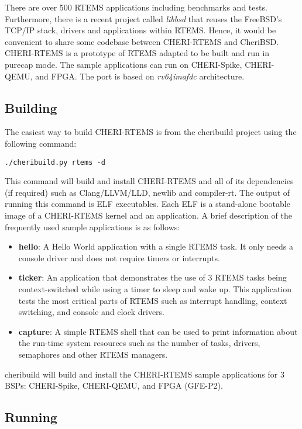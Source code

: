 \documentclass[12pt,twoside,openright,a4paper]{article}
\begin{document}
There are over 500 RTEMS applications including benchmarks and tests.
Furthermore, there is a recent project called \textit{libbsd} that reuses
the FreeBSD's TCP/IP stack, drivers and applications within RTEMS. Hence,
it would be convenient to share some codebase between CHERI-RTEMS and
CheriBSD. \\

CHERI-RTEMS is a prototype of RTEMS adapted to be built and run in purecap
mode. The sample applications can run on CHERI-Spike, CHERI-QEMU, and FPGA.
The port is based on \textit{rv64imafdc} architecture.

\subsection{Building}
The easiest way to build CHERI-RTEMS is from the cheribuild project using
the following command:

\begin{lstlisting}
./cheribuild.py rtems -d
\end{lstlisting}

This command will build and install CHERI-RTEMS and all of its dependencies (if required)
such as Clang/LLVM/LLD, newlib and compiler-rt. The output of running this command is
ELF executables. Each ELF is a stand-alone bootable image of a CHERI-RTEMS
kernel and an application. A brief description of the frequently used sample
applications is as follows:
\begin{itemize}
	\item \textbf{hello}: A Hello World application with a single RTEMS task. It only needs
	a console driver and does not require timers or interrupts.
	\item \textbf{ticker}: An application that demonstrates the use of 3 RTEMS tasks being
	context-switched while using a timer to sleep and wake up. This application tests the
	most critical parts of RTEMS such as interrupt handling, context switching, and console and
	clock drivers.
	\item \textbf{capture}: A simple RTEMS shell that can be used to print information about
	the run-time system resources such as the number of tasks, drivers, semaphores and other
	RTEMS managers.
\end{itemize}

cheribuild will build and install the CHERI-RTEMS sample applications for 3 BSPs: CHERI-Spike,
CHERI-QEMU, and FPGA (GFE-P2).

\subsection{Running}
\end{document}
